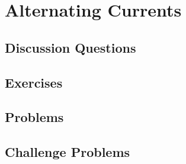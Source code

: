 
\chapter{Alternating Currents}

\section{Discussion Questions}

\section{Exercises}

\section{Problems}

\section{Challenge Problems}
